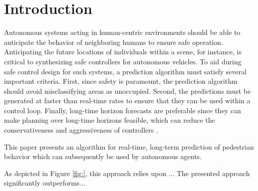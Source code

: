 \documentclass[letterpaper,10pt,conference]{ieeeconf}
\begin{document}

\section{Introduction}

Autonomous systems acting in human-centric environments should be able to anticipate the behavior of neighboring humans to ensure safe operation. 
Anticipating the future locations of individuals within a scene, for instance, is critical to synthesizing safe controllers for autonomous vehicles.
To aid during safe control design for such systems, a prediction algorithm must satisfy several important criteria.
First, since safety is paramount, the prediction algorithm should avoid misclassifying areas as unoccupied.
Second, the predictions must be generated at faster than real-time rates to ensure that they can be used within a control loop.
Finally, long-time horizon forecasts are preferable since they can make planning over long-time horizons feasible, which can reduce the conservativeness and aggressiveness of controllers \cite{}.

This paper presents an algorithm for real-time, long-term prediction of pedestrian behavior which can subsequently be used by autonomous agents.

As depicted in Figure \ref{fig:}, this approach relies upon ... 
The presented approach significantly outperforms...
\end{document}
